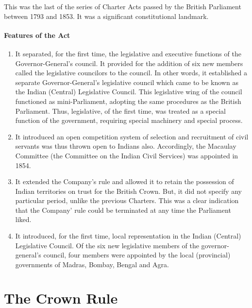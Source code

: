 This was the last of the series of Charter Acts passed by the British Parliament between 1793 and 1853. It was a significant constitutional landmark.
\paragraph{Features of the Act}

\begin{enumerate}
  \item It separated, for the first time, the legislative and executive functions of the Governor-General's council. It provided for the addition of six new members called the legislative councilors to the council. In other words, it established a separate Governor-General's legislative council which came to be known as the Indian (Central) Legislative Council. This legislative wing of the council functioned as mini-Parliament, adopting the same procedures as the British Parliament. Thus, legislative, of the first time, was treated as a special function of the government, requiring special machinery and special process.
  \item It introduced an open competition system of selection and recruitment of civil servants was thus thrown open to Indians also. Accordingly, the Macaulay Committee (the Committee on the Indian Civil Services) was appointed in 1854.
  \item It extended the Company's rule and allowed it to retain the possession of Indian territories on trust for the British Crown. But, it did not specify any particular period, unlike the previous Charters. This was a clear indication that the Company' rule could be terminated at any time the Parliament liked.
  \item It introduced, for the first time, local representation in the Indian (Central) Legislative Council. Of the six new legislative members of the governor-general's council, four members were appointed by the local (provincial) governments of Madras, Bombay, Bengal and Agra.
\end{enumerate}

\section{The Crown Rule}

